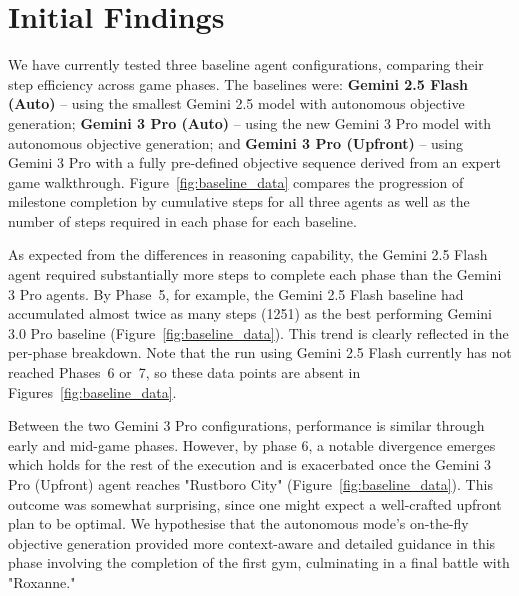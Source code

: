 \documentclass[11pt]{article}
\begin{document}

\section{Initial Findings}

We have currently tested three baseline agent configurations, comparing their step efficiency across game phases. The baselines were: \textbf{Gemini 2.5 Flash (Auto)} – using the smallest Gemini 2.5 model with autonomous objective generation; \textbf{Gemini 3 Pro (Auto)} – using the new Gemini 3 Pro model with autonomous objective generation; and \textbf{Gemini 3 Pro (Upfront)} – using Gemini 3 Pro with a fully pre-defined objective sequence derived from an expert game walkthrough. Figure~\ref{fig:baseline_data} compares the progression of milestone completion by cumulative steps for all three agents as well as the number of steps required in each phase for each baseline.

As expected from the differences in reasoning capability, the Gemini 2.5 Flash agent required substantially more steps to complete each phase than the Gemini 3 Pro agents. By Phase~5, for example, the Gemini 2.5 Flash baseline had accumulated almost twice as many steps (1251) as the best performing Gemini 3.0 Pro baseline (Figure~\ref{fig:baseline_data}). This trend is clearly reflected in the per-phase breakdown. Note that the run using Gemini 2.5 Flash currently has not reached Phases~6 or~7, so these data points are absent in Figures~\ref{fig:baseline_data}.

Between the two Gemini 3 Pro configurations, performance is similar through early and mid-game phases. However, by phase 6, a notable divergence emerges which holds for the rest of the execution and is exacerbated once the Gemini 3 Pro (Upfront) agent reaches "Rustboro City"  (Figure~\ref{fig:baseline_data}). This outcome was somewhat surprising, since one might expect a well-crafted upfront plan to be optimal. We hypothesise that the autonomous mode’s on-the-fly objective generation provided more context-aware and detailed guidance in this phase involving the completion of the first gym, culminating in a final battle with "Roxanne."
\end{document}
